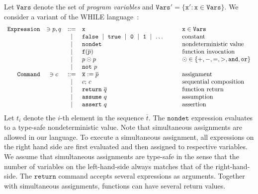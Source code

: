 
Let $\mathtt{Vars}$ denote the set of \emph{program variables} and
$\mathtt{Vars}' = \{ \mathtt{x}' : \mathtt{x} \in \mathtt{Vars} \}$.
We consider a variant of the WHILE language~\cite{NielsonHC99}:
\begin{equation*}
  \begin{array}{rccll}
    \mathtt{Expression} & \ni p, q & ::= &
    \mathtt{x} & \mathtt{x} \in \mathtt{Vars}\\
    & & \mid &
    \mathtt{false}\ \mid\ \mathtt{true}\ \mid\ 
    \mathtt{0}\ \mid\ \mathtt{1}\ \mid\ \ldots\hspace{.06\textwidth} &
    \textmd{constant}\\
    & & \mid &
    \mathtt{nondet} & \textmd{nondeterministic value}\\
    & & \mid &
    \mathtt{f}(\overline{p}) &
    \textmd{function invocation}\\
    & & \mid &
    p \odot p  & \odot \in \{ +, -, =, >, \mathtt{and}, \mathtt{or} \}\\
    & & \mid & \mathtt{not}\ p\\
    \mathtt{Command} & \ni c & ::= &
    \overline{\mathtt{x}} := \overline{p}
    & \textmd{assignment}\\
    & & \mid &
    c\mathtt{;}\ c &
    \textmd{sequential composition}\\
    & & \mid &
    \mathtt{return}\ \overline{q} & \textmd{function return}\\
    & & \mid &
    \mathtt{assume}\ q & \textmd{assumption}\\
    & & \mid &
    \mathtt{assert}\ q & \textmd{assertion}
  \end{array}
\end{equation*}
Let $t_i$ denote the $i$-th element in the sequence $\overline{t}$.
The $\mathtt{nondet}$ expression evaluates to a type-safe
nondeterministic value.
Note that simultaneous assignments are allowed in our language. To
execute a simultaneous assignment, all expressions on the right hand
side are first evaluated and then assigned to respective variables. 
We assume that simultaneous assignments are type-safe in the sense that the number of variables on the left-hand-side always matches that of the right-hand-side.
The $\mathtt{return}$ command accepts several expressions as arguments.
Together with simultaneous assignments, functions can have several
return values. 

